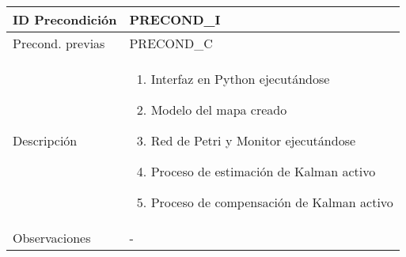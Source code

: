 \sffamily \small \begin{center} \begin{tabular} {|p{3cm}|p{9cm}|}
    \hline \rowcolor{precond_header_color}
        ID Precondición     & PRECOND\_I \\
    \hline
        Precond. previas    & PRECOND\_C \\
    \hline
        Descripción         & \begin{enumerate}
                                \item Interfaz en Python ejecutándose
                                \item Modelo del mapa creado
                                \item Red de Petri y Monitor ejecutándose
                                \item Proceso de estimación de Kalman activo
                                \item Proceso de compensación de Kalman activo
                            \end{enumerate} \\
    \hline
        Observaciones       & - \\
    \hline
\end{tabular} \end{center} \normalsize \normalfont
